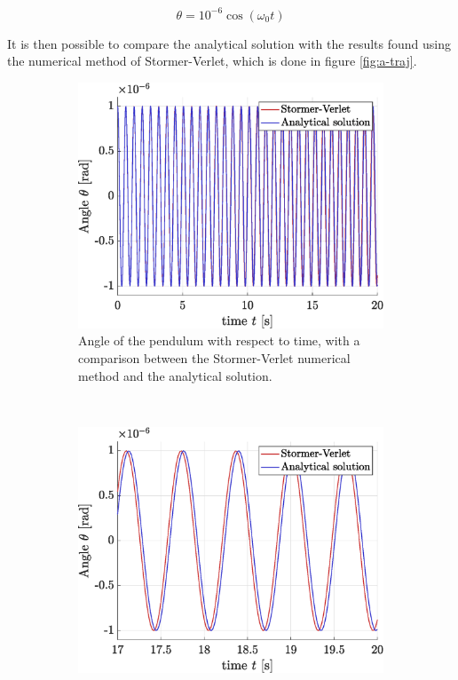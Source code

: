 \documentclass[a4paper,12pt,twoside]{article}
\begin{document}
\begin{equation}
	\theta = 10^{-6}\cos(\omega_0t)
	\label{eq:a-sol-ana}
\end{equation}

It is then possible to compare the analytical solution with the results found using the numerical method of Stormer-Verlet, which is done in figure \ref{fig:a-traj}.

\begin{figure}[h]
\centering
\begin{subfigure}[t]{0.45\textwidth}
	\includegraphics[width=\textwidth]{graphs/a_traj_full.eps}
	\caption{Angle of the pendulum with respect to time, with a comparison between the Stormer-Verlet numerical method and the analytical solution.}
	\label{fig:a-traj-full}
\end{subfigure}
~
\begin{subfigure}[t]{0.45\textwidth}
	\includegraphics[width=\textwidth]{graphs/a_traj_zoomed.eps}

\end{subfigure}
\end{figure}
\end{document}
